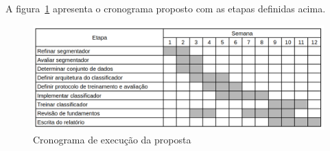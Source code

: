 \documentclass[12pt]{article}
\begin{document}
A figura~\ref{fig:crono} apresenta o cronograma proposto com as etapas definidas acima.

\begin{figure}[htb]
 \centering
 \includegraphics[width=1.0\textwidth]{images/crono_q2.png}
 \caption{Cronograma de execução da proposta}
 \label{fig:crono}
\end{figure}

\bigskip


\end{document}
